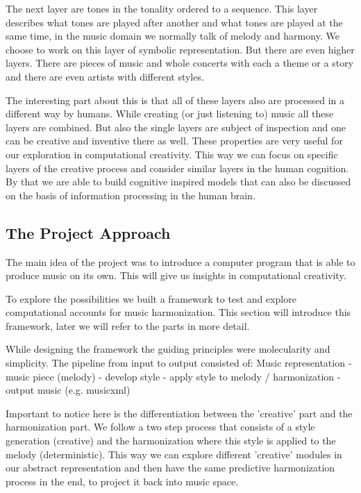 The next layer are tones in the tonality ordered to a sequence. This layer describes what tones are played after another and what tones are played at the same time, in the music domain we normally talk of melody and harmony. We choose to work on this layer of symbolic representation. But there are even higher layers. There are pieces of music and whole concerts with each a theme or a story and there are even artists with different styles.

The interesting part about this is that all of these layers also are processed in a different way by humans. While creating (or just listening to) music all these layers are combined. But also the single layers are subject of inspection and one can be creative and inventive there as well. These properties are very useful for our exploration in computational creativity. This way we can focus on specific layers of the creative process and consider similar layers in the human cognition. By that we are able to build cognitive inspired models that can also be discussed on the basis of information processing in the human brain. 

\subsection{The Project Approach}
The main idea of the project was to introduce a computer program that is able to produce music on its own. This will give us insights in computational creativity.

To explore the possibilities we built a framework to test and explore computational accounts for music harmonization. This section will introduce this framework, later we will refer to the parts in more detail.

While designing the framework the guiding principles were molecularity and simplicity. The pipeline from input to output consisted of: Music representation - music piece (melody) - develop style - apply style to melody / harmonization - output music (e.g. musicxml)

Important to notice here is the differentiation between the 'creative' part and the harmonization part. We follow a two step process that consists of a style generation (creative) and the harmonization where this style is applied to the melody (deterministic). This way we can explore different 'creative' modules in our abstract representation and then have the same predictive harmonization process in the end, to project it back into music space.

